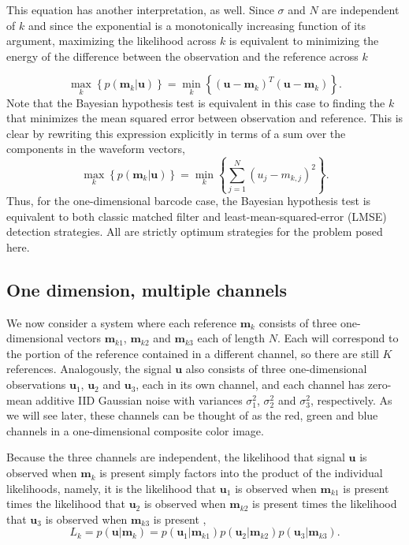 This equation has another interpretation, as well. Since $\sigma$ and $N$ are independent of $k$ and since the exponential is a monotonically increasing function of its argument, maximizing the likelihood across $k$ is equivalent to minimizing the energy of the difference between the observation and the reference across $k$ 

\begin{equation}
\max_k   \left\{ p(\mathbf{m}_k|\mathbf{u}) \right\} = \min_k  \left\{ (\mathbf{u}-\mathbf{m}_k)^T(\mathbf{u}-\mathbf{m}_k) \right\}. 
\end{equation}
Note that the Bayesian hypothesis test is equivalent in this case to finding the $k$ that minimizes the mean squared error between observation and reference. This is clear by rewriting this expression explicitly in terms of a sum over the components in the waveform vectors,
\begin{equation}
\max_k   \left\{ p(\mathbf{m}_k|\mathbf{u}) \right\} =  \min_k  \left\{ \sum_{j=1}^N  (u_j-m_{k,j})^2   \right\}. 
\end{equation}
Thus, for the one-dimensional barcode case, the Bayesian hypothesis test is equivalent to both classic matched filter and least-mean-squared-error (LMSE) detection strategies. All are strictly optimum strategies for the problem posed here.

\subsection{One dimension, multiple channels}\label{sec:simpleModel}
We now consider a system where each reference $\mathbf{m}_k$ consists of three one-dimensional vectors $\mathbf{m}_{k1}$, $\mathbf{m}_{k2}$ and $\mathbf{m}_{k3}$ each of length $N$. Each will correspond to the portion of the reference contained in a different channel, so there are still $K$ references. Analogously, the signal $\mathbf{u}$ also consists of three one-dimensional observations $\mathbf{u}_1$, $\mathbf{u}_2$ and $\mathbf{u}_3$, each in its own channel, and each channel has zero-mean additive IID Gaussian noise with variances $\sigma_1^2$, $\sigma_2^2$ and $\sigma_3^2$, respectively. As we will see later, these channels can be thought of as the red, green and blue channels in a one-dimensional composite color image. 

Because the three channels are independent, the likelihood that signal $\mathbf{u}$ is observed when $\mathbf{m}_k$ is present simply factors into the product of the individual likelihoods, namely, it is the likelihood that $\mathbf{u}_1$ is observed when $\mathbf{m}_{k1}$ is present times the likelihood that $\mathbf{u}_2$ is observed when $\mathbf{m}_{k2}$ is present times the likelihood that $\mathbf{u}_3$ is observed when $\mathbf{m}_{k3}$ is present \citep{bretthorst_probability_2003},
\begin{equation}
L_k = p(\mathbf{u}|\mathbf{m}_k) = p(\mathbf{u}_1|\mathbf{m}_{k1})p(\mathbf{u}_2|\mathbf{m}_{k2})p(\mathbf{u}_3|\mathbf{m}_{k3}).
\end{equation}

